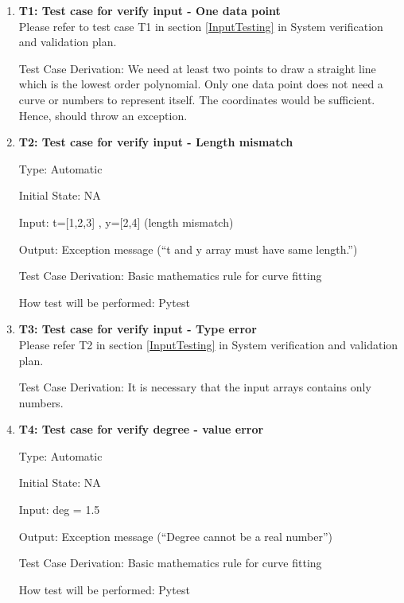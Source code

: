 \documentclass[12pt, titlepage]{article}
\begin{document}
\begin{enumerate}

\item{\textbf{T1: Test case for verify input - One data point}}\\
Please refer to test case T1 in section \ref{InputTesting} in System 
verification and validation plan.
				
Test Case Derivation: We need at least two points to draw a straight line which 
is the lowest order polynomial. Only one data point does not need a curve or 
numbers to represent itself. The coordinates would be sufficient. Hence, 
\famname{} should throw an exception.


					
\item{\textbf{T2: Test case for verify input - Length mismatch}}

Type: Automatic
					
Initial State: NA 
					
Input: t=[1,2,3] , y=[2,4] (length mismatch)
					
Output: Exception message (``t and y array must have same length.'')

Test Case Derivation: Basic mathematics rule for curve fitting 

How test will be performed: Pytest


\item{\textbf{T3: Test case for verify input - Type error}}\\
Please refer T2 in section \ref{InputTesting} in System verification and 
validation plan.
					

Test Case Derivation: It is necessary that the input arrays contains only 
numbers.



\item{\textbf{T4: Test case for verify degree - value error}}

Type: Automatic

Initial State: NA 

Input: deg = 1.5 

Output: Exception message (``Degree cannot be a real number'')

Test Case Derivation: Basic mathematics rule for curve fitting 

How test will be performed: Pytest



\end{enumerate}
\end{document}
